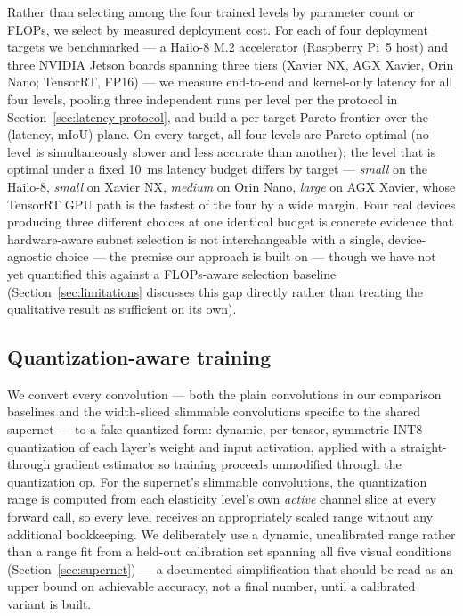 \documentclass[a4paper,review,12pt]{elsarticle}
\begin{document}
Rather than selecting among the four trained levels by parameter count or
FLOPs, we select by measured deployment cost. For each of four deployment
targets we benchmarked --- a Hailo-8 M.2 accelerator (Raspberry Pi~5 host) and
three NVIDIA Jetson boards spanning three tiers (Xavier NX, AGX Xavier, Orin
Nano; TensorRT, FP16) --- we measure end-to-end and kernel-only latency for
all four levels, pooling three independent runs per level per the protocol in
Section~\ref{sec:latency-protocol}, and build a per-target Pareto frontier
over the (latency, mIoU) plane. On every target, all four levels are
Pareto-optimal (no level is simultaneously slower and less accurate than
another); the level that is optimal under a fixed 10~ms latency budget differs
by target --- \emph{small} on the Hailo-8, \emph{small} on Xavier NX,
\emph{medium} on Orin Nano, \emph{large} on AGX Xavier, whose TensorRT GPU
path is the fastest of the four by a wide margin. Four real devices producing
three different choices at one identical budget is concrete evidence that
hardware-aware subnet selection is not interchangeable with a single,
device-agnostic choice --- the premise our approach is built on --- though we
have not yet quantified this against a FLOPs-aware selection baseline
(Section~\ref{sec:limitations} discusses this gap directly rather than
treating the qualitative result as sufficient on its own).

\subsection{Quantization-aware training}
\label{sec:qat}

We convert every convolution --- both the plain convolutions in our
comparison baselines and the width-sliced slimmable convolutions specific to
the shared supernet --- to a fake-quantized form: dynamic, per-tensor,
symmetric INT8 quantization of each layer's weight and input activation,
applied with a straight-through gradient estimator so training proceeds
unmodified through the quantization op. For the supernet's slimmable
convolutions, the quantization range is computed from each elasticity level's
own \emph{active} channel slice at every forward call, so every level
receives an appropriately scaled range without any additional bookkeeping. We
deliberately use a dynamic, uncalibrated range rather than a range fit from a
held-out calibration set spanning all five visual conditions
(Section~\ref{sec:supernet}) --- a documented simplification that should be
read as an upper bound on achievable accuracy, not a final number, until a
calibrated variant is built.
\end{document}
